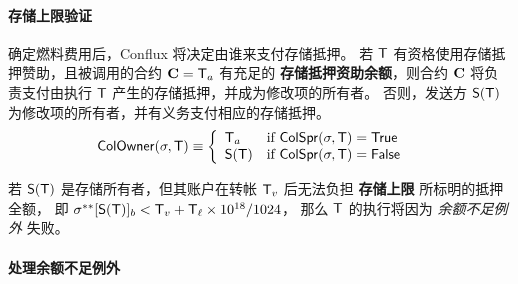 \paragraph{存储上限验证}

确定燃料费用后，Conflux 将决定由谁来支付存储抵押。
若 $\textsf{T}$ 有资格使用存储抵押赞助，且被调用的合约 $\mathbf{C}=\textsf{T}_a$ 有充足的 \textbf{存储抵押资助余额}，则合约 $\mathbf{C}$ 将负责支付由执行 $\textsf{T}$ 产生的存储抵押，并成为修改项的所有者。
%
否则，发送方 $\mathsf{S}{\left({\textsf{T}} \right)}$ 为修改项的所有者，并有义务支付相应的存储抵押。
%
\begin{align}
	\mathsf{ColOwner}(\mathbf{\sigma},\textsf{T}) &\equiv\left\{ \begin{array}{ll}
		\textsf{T}_a & \text{if } \mathsf{ColSpr}(\mathbf{\sigma},\textsf{T}) = \mathsf{True} \\ 
		\mathsf{S}{\left({\textsf{T}} \right)} & \text{if } \mathsf{ColSpr}(\mathbf{\sigma},\textsf{T}) = \mathsf{False} \\ 
	\end{array}\right.
\end{align}

若 $\mathsf{S}{\left({\textsf{T}} \right)}$ 是存储所有者，但其账户在转帐 $\textsf{T}_v$ 后无法负担 {\bf 存储上限} 所标明的抵押全额，
即 $\mathbf{\sigma}^{**}[\mathsf{S}{\left({\textsf{T}} \right)}]_b<\textsf{T}_v+\textsf{T}_\ell\times 10^{18}/1024$，
那么 $\textsf{T}$ 的执行将因为 \emph{余额不足例外} 失败。

\paragraph{处理余额不足例外} 

